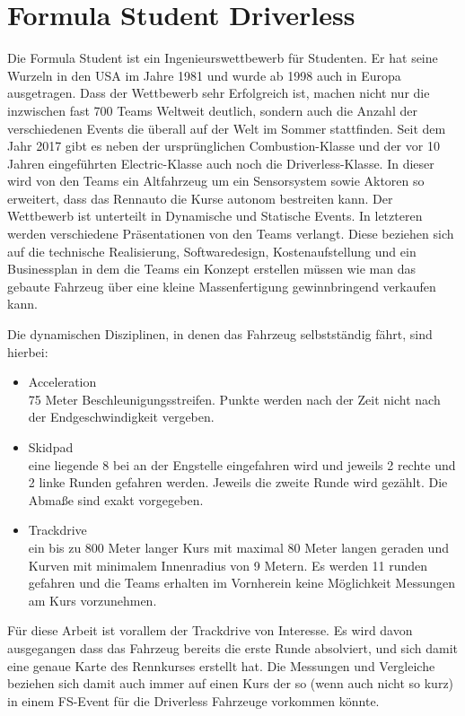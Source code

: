 \documentclass{like}
\begin{document}
\section{Formula Student Driverless}

Die Formula Student ist ein Ingenieurswettbewerb für Studenten. Er hat seine Wurzeln in den USA im Jahre 1981 und wurde ab 1998 auch in Europa ausgetragen.
Dass der Wettbewerb sehr Erfolgreich ist, machen nicht nur die inzwischen fast 700 Teams Weltweit \cite{FsWorldRank:1} deutlich, sondern auch die Anzahl der verschiedenen Events die überall auf der Welt im Sommer stattfinden. Seit dem Jahr 2017 gibt es neben der ursprünglichen Combustion-Klasse und der vor 10 Jahren eingeführten Electric-Klasse auch noch die Driverless-Klasse.
In dieser wird von den Teams ein Altfahrzeug um ein Sensorsystem sowie Aktoren so erweitert, dass das Rennauto die Kurse autonom bestreiten kann.
Der Wettbewerb ist unterteilt in Dynamische und Statische Events. In letzteren werden verschiedene Präsentationen von den Teams verlangt. Diese beziehen sich auf die technische Realisierung, Softwaredesign, Kostenaufstellung und ein Businessplan in dem die Teams ein Konzept erstellen müssen wie man das gebaute Fahrzeug über eine kleine Massenfertigung gewinnbringend verkaufen kann.

Die dynamischen Disziplinen, in denen das Fahrzeug selbstständig fährt, sind hierbei:
\begin{itemize}
	\item Acceleration \\ 75 Meter Beschleunigungsstreifen. Punkte werden nach der Zeit nicht nach der Endgeschwindigkeit vergeben.
	\item Skidpad \\ eine liegende 8 bei an der Engstelle eingefahren wird und jeweils 2 rechte und 2 linke Runden gefahren werden. Jeweils die zweite Runde wird gezählt. Die Abmaße sind exakt vorgegeben.
	\item Trackdrive \\ ein bis zu 800 Meter langer Kurs mit maximal 80 Meter langen geraden und Kurven mit minimalem Innenradius von 9 Metern. Es werden 11 runden gefahren und die Teams erhalten im Vornherein keine Möglichkeit Messungen am Kurs vorzunehmen.
\end{itemize}

Für diese Arbeit ist vorallem der Trackdrive von Interesse. Es wird davon ausgegangen dass das Fahrzeug bereits die erste Runde absolviert, und sich damit eine genaue Karte des Rennkurses erstellt hat. Die Messungen und Vergleiche beziehen sich damit auch immer auf einen Kurs der so (wenn auch nicht so kurz) in einem FS-Event für die Driverless Fahrzeuge vorkommen könnte.
 
\end{document}
